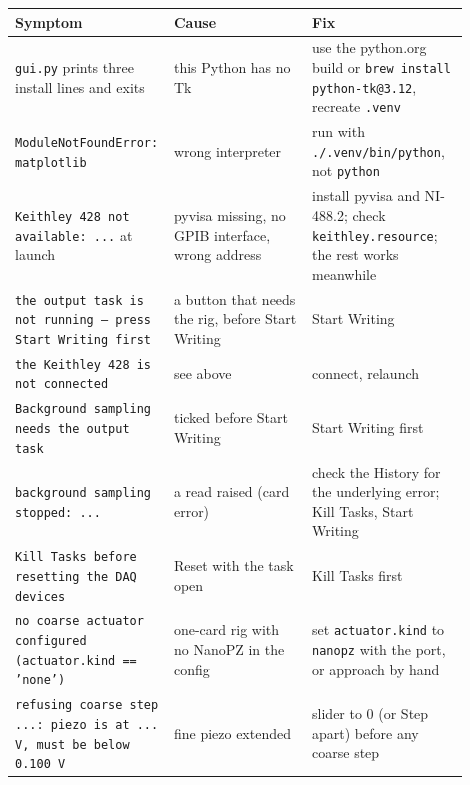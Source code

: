 \small\setlength{\LTleft}{0pt}\setlength{\LTright}{\fill}
\begin{longtable}{@{}>{\raggedright\arraybackslash}p{0.26\linewidth}>{\raggedright\arraybackslash}p{0.30\linewidth}>{\raggedright\arraybackslash}p{0.34\linewidth}@{}}
\toprule
\textbf{Symptom} & \textbf{Cause} & \textbf{Fix} \\
\midrule\endhead
\texttt{gui.\discretionary{}{}{}py} prints three install lines and exits & this Python has no Tk & use the python.org build or \texttt{brew install python-tk@3.\discretionary{}{}{}12}, recreate \texttt{.\discretionary{}{}{}venv} \\
\texttt{Module\discretionary{}{}{}Not\discretionary{}{}{}Found\discretionary{}{}{}Error: matplotlib} & wrong interpreter & run with \texttt{.\discretionary{}{}{}/\discretionary{}{}{}.\discretionary{}{}{}venv/\discretionary{}{}{}bin/\discretionary{}{}{}python}, not \texttt{python} \\
\texttt{Keithley 428 not available: .\discretionary{}{}{}.\discretionary{}{}{}.\discretionary{}{}{}} at launch & pyvisa missing, no GPIB interface, wrong address & install pyvisa and NI-488.2; check \texttt{keithley.\discretionary{}{}{}resource}; the rest works meanwhile \\
\texttt{the output task is not running -- press Start Writing first} & a button that needs the rig, before Start Writing & Start Writing \\
\texttt{the Keithley 428 is not connected} & see above & connect, relaunch \\
\texttt{Background sampling needs the output task} & ticked before Start Writing & Start Writing first \\
\texttt{background sampling stopped: .\discretionary{}{}{}.\discretionary{}{}{}.\discretionary{}{}{}} & a read raised (card error) & check the History for the underlying error; Kill Tasks, Start Writing \\
\texttt{Kill Tasks before resetting the DAQ devices} & Reset with the task open & Kill Tasks first \\
\texttt{no coarse actuator configured (actuator.\discretionary{}{}{}kind == 'none')} & one-card rig with no NanoPZ in the config & set \texttt{actuator.\discretionary{}{}{}kind} to \texttt{nanopz} with the port, or approach by hand \\
\texttt{refusing coarse step .\discretionary{}{}{}.\discretionary{}{}{}.\discretionary{}{}{}: piezo is at .\discretionary{}{}{}.\discretionary{}{}{}.\discretionary{}{}{} V,\discretionary{}{}{} must be below 0.\discretionary{}{}{}100 V} & fine piezo extended & slider to 0 (or Step apart) before any coarse step \\

\end{longtable}
